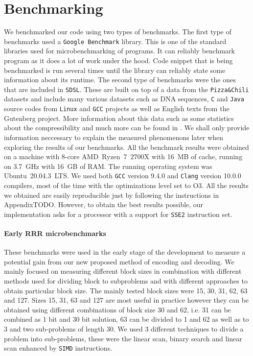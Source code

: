 \section{Benchmarking}

We benchmarked our code using two types of benchmarks. The first type of benchmarks used
a \texttt{Google Benchmark} library. This is one of the standard libraries used for
microbenchmarking of programs. It can reliably benchmark program as it does a lot of work
under the hood. Code snippet that is being benchmarked is run several times until the
library can reliably state some information about its runtime. The second type of benchmarks
were the ones that are included in \texttt{SDSL}. These are built on top of a data from the
\texttt{Pizza\&Chili} datasets \citep{ferragina2005pizza} and include many various datasets such
as DNA sequences, \texttt{C} and \texttt{Java} source codes from \texttt{Linux} and \texttt{GCC}
projects as well as English texts from the Gutenberg project. More information about this
data such as some statistics about the compressibility and much more can be found in
\cite{ferragina2009compressed}. We shall only provide information neccessary to explain the
measured phenomenons later when exploring the results of our benchmarks. All the benchmark
results were obtained on a machine with 8-core AMD~Ryzen~7~2700X with 16~MB of cache, running
on 3.7~GHz with 16~GB of RAM. The running operating system was Ubuntu~20.04.3~LTS.
We used both \texttt{GCC} version 9.4.0 and \texttt{Clang} version 10.0.0 compilers,
most of the time with the optimizations level set to O3. All the results we obtained are
easily reproducible just by following the instructions in AppendixTODO. However, to obtain
the best results possible, our implementation asks for a processor with a support for \texttt{SSE2}
instruction set.

\paragraph{Early RRR microbenchmarks}

These benchmarks were used in the early stage of the development to measure a potential gain from
our new proposed method of encoding and decoding. We mainly focused on measuring different block sizes
in combination with different methods used for dividing block to subproblems and with different
approaches to obtain particular block size. The mainly tested block sizes were 15, 30, 31, 62, 63
and 127. Sizes 15, 31, 63 and 127 are most useful in practice however they can be obtained using
different combinations of block size 30 and 62, i.e. 31 can be combined as 1 bit and 30 bit solution,
63 can be divided to 1 and 62 as well as to 3 and two sub-problems of length 30.
We used 3 different techniques to divide a problem into sub-problems, these were the linear scan,
binary search and linear scan enhanced by \texttt{SIMD} instructions.

